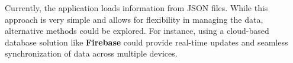 Currently, the application loads information from JSON files. While this approach is very simple and allows for flexibility in managing the data, alternative methods could be explored. For instance, using a cloud-based database solution like \textbf{Firebase} \cite{firebase} could provide real-time updates and seamless synchronization of data across multiple devices.

